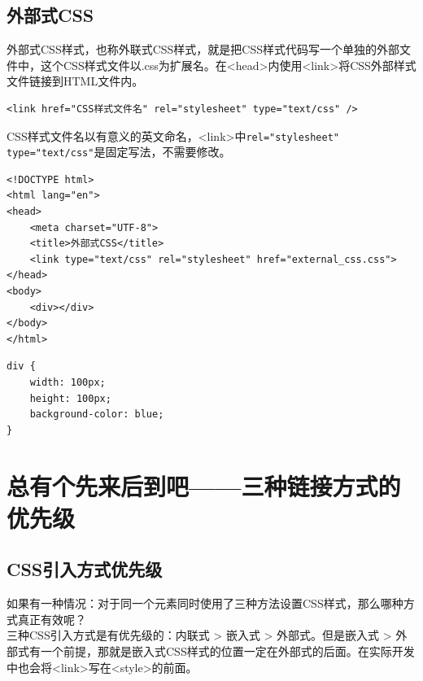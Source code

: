 \subsection{外部式CSS}

外部式CSS样式，也称外联式CSS样式，就是把CSS样式代码写一个单独的外部文件中，这个CSS样式文件以.css为扩展名。在<head>内使用<link>将CSS外部样式文件链接到HTML文件内。\\

\begin{lstlisting}[style=htmlcssjs]
<link href="CSS样式文件名" rel="stylesheet" type="text/css" />
\end{lstlisting}

CSS样式文件名以有意义的英文命名，<link>中\lstinline|rel="stylesheet" type="text/css"|是固定写法，不需要修改。\\


\begin{lstlisting}[style=htmlcssjs, title=external\_css.html]
<!DOCTYPE html>
<html lang="en">
<head>
    <meta charset="UTF-8">
    <title>外部式CSS</title>
    <link type="text/css" rel="stylesheet" href="external_css.css">
</head>
<body>
    <div></div>
</body>
</html>
\end{lstlisting}

\begin{lstlisting}[style=htmlcssjs, title=external\_css.css]
div {
    width: 100px;
    height: 100px;
    background-color: blue;
}
\end{lstlisting}

\newpage

\section{总有个先来后到吧——三种链接方式的优先级}

\subsection{CSS引入方式优先级}

如果有一种情况：对于同一个元素同时使用了三种方法设置CSS样式，那么哪种方式真正有效呢？\\

三种CSS引入方式是有优先级的：内联式 > 嵌入式 > 外部式。但是嵌入式 > 外部式有一个前提，那就是嵌入式CSS样式的位置一定在外部式的后面。在实际开发中也会将<link>写在<style>的前面。\\

